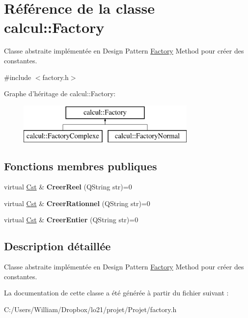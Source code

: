 \hypertarget{classcalcul_1_1_factory}{\section{Référence de la classe calcul\-:\-:Factory}
\label{classcalcul_1_1_factory}
}


Classe abstraite implémentée en Design Pattern \hyperlink{classcalcul_1_1_factory}{Factory} Method pour créer des constantes.  




{\ttfamily \#include $<$factory.\-h$>$}

Graphe d'héritage de calcul\-:\-:Factory\-:\begin{figure}[H]
\begin{center}
\leavevmode
\includegraphics[height=2.000000cm]{classcalcul_1_1_factory}
\end{center}
\end{figure}
\subsection*{Fonctions membres publiques}
\begin{DoxyCompactItemize}
\item 
\hypertarget{classcalcul_1_1_factory_a359dd99c76b415398b59e757db6460ef}{virtual \hyperlink{classcalcul_1_1_cst}{Cst} \& {\bfseries Creer\-Reel} (Q\-String str)=0}\label{classcalcul_1_1_factory_a359dd99c76b415398b59e757db6460ef}

\item 
\hypertarget{classcalcul_1_1_factory_aa63c4d76b2435c896d83630f28f7ad20}{virtual \hyperlink{classcalcul_1_1_cst}{Cst} \& {\bfseries Creer\-Rationnel} (Q\-String str)=0}\label{classcalcul_1_1_factory_aa63c4d76b2435c896d83630f28f7ad20}

\item 
\hypertarget{classcalcul_1_1_factory_aa58cc259626e09447f944f020a21b01d}{virtual \hyperlink{classcalcul_1_1_cst}{Cst} \& {\bfseries Creer\-Entier} (Q\-String str)=0}\label{classcalcul_1_1_factory_aa58cc259626e09447f944f020a21b01d}

\end{DoxyCompactItemize}


\subsection{Description détaillée}
Classe abstraite implémentée en Design Pattern \hyperlink{classcalcul_1_1_factory}{Factory} Method pour créer des constantes. 

La documentation de cette classe a été générée à partir du fichier suivant \-:\begin{DoxyCompactItemize}
\item 
C\-:/\-Users/\-William/\-Dropbox/lo21/projet/\-Projet/factory.\-h\end{DoxyCompactItemize}
